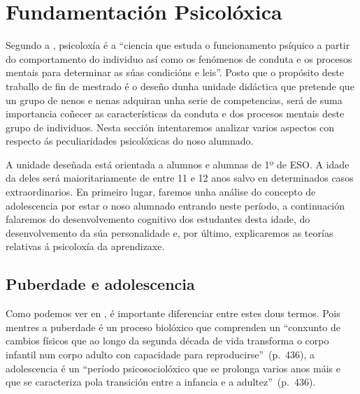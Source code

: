 

\section{Fundamentación Psicolóxica}

Segundo a , psicoloxía é a ``ciencia que estuda o funcionamento psíquico a partir do comportamento do individuo así como os fenómenos de conduta e os procesos mentais para determinar as súas condicións e leis''. Posto que o propósito deste traballo de fin de mestrado é o deseño dunha unidade didáctica que pretende que un grupo de nenos e nenas adquiran unha serie de competencias, será de suma importancia coñecer as características da conduta e dos procesos mentais deste grupo de individuos. Nesta sección intentaremos analizar varios aspectos con respecto ás peculiaridades psicolóxicas do noso alumnado.

A unidade deseñada está orientada a alumnos e alumnas de 1º de ESO. A idade da deles será maioritariamente de entre 11 e 12 anos salvo en determinados casos extraordinarios.
En primeiro lugar, faremos unha análise do concepto de adolescencia por estar o noso alumnado entrando neste período, a continuación falaremos do desenvolvemento cognitivo dos estudantes desta idade, do desenvolvemento da súa personalidade e, por último, explicaremos as teorías relativas á psicoloxía da aprendizaxe.

\subsection{Puberdade e adolescencia}
Como podemos ver en , é importante diferenciar entre estes dous termos. Pois mentres a puberdade é un proceso biolóxico que comprenden un ``conxunto de cambios físicos que ao longo da segunda década de vida transforma o corpo infantil nun corpo adulto con capacidade para reproducirse''~(p.~436), a adolescencia é un ``período psicosociolóxico que se prolonga varios anos máis e que se caracteriza pola transición entre a infancia e a adultez''~(p.~436).


